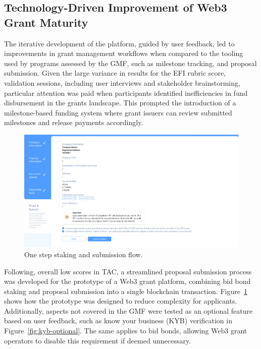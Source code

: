 \documentclass[conference]{IEEEtran}
\begin{document}
\subsection{Technology-Driven Improvement of Web3 Grant Maturity}\label{sec_4.3}

The iterative development of the platform, guided by user feedback, led to improvements in grant management workflows when compared to the tooling used by programs assessed by the GMF, such as milestone tracking, and proposal submission. Given the large variance in results for the EFI rubric score, validation sessions, including user interviews and stakeholder brainstorming, particular attention was paid when participants identified inefficiencies in fund disbursement in the grants landscape. This prompted the introduction of a milestone-based funding system where grant issuers can review submitted milestones and release payments accordingly.

\begin{figure}[htbp]
\centerline{\includegraphics[scale=0.1]{auth-stake-submit-blinded.png}}
\caption{One step staking and submission flow.}
\label{fig:stake-submit}
\end{figure}

Following, overall low scores in TAC, a streamlined proposal submission process was developed for the prototype of a Web3 grant platform, combining bid bond staking and proposal submission into a single blockchain transaction. Figure~\ref{fig:stake-submit} shows how the prototype was designed to reduce complexity for applicants. Additionally, aspects not covered in the GMF were tested as an optional feature based on user feedback, such as know your business (KYB) verification in Figure~\ref{fig:kyb-optional}. The same applies to bid bonds, allowing Web3 grant operators to disable this requirement if deemed unnecessary.
\end{document}
